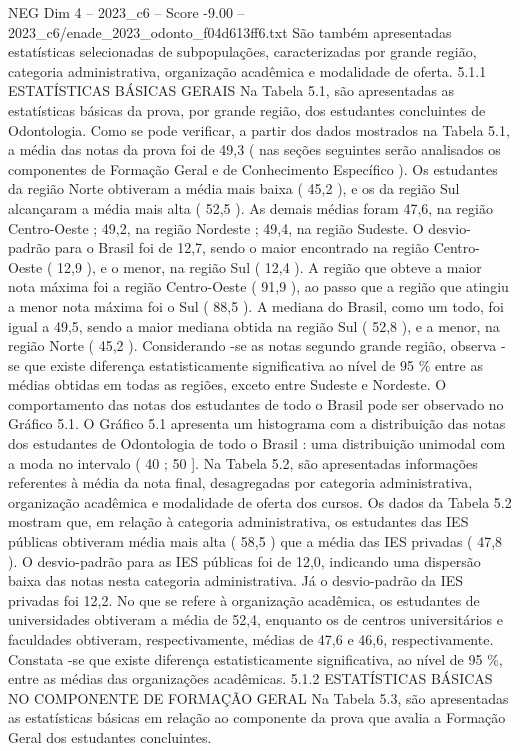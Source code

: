\begin{textsample}{NEG Dim 4 – 2023\_c6 – Score -9.00 – 2023\_c6/enade\_2023\_odonto\_f04d613ff6.txt}
São também apresentadas estatísticas selecionadas de subpopulações, caracterizadas por grande região, categoria administrativa, organização acadêmica e modalidade de oferta. 5.1.1 ESTATÍSTICAS BÁSICAS GERAIS Na Tabela 5.1, são apresentadas as estatísticas básicas da prova, por grande região, dos estudantes concluintes de Odontologia.
Como se pode verificar, a partir dos dados mostrados na Tabela 5.1, a média das notas da prova foi de 49,3 ( nas seções seguintes serão analisados os componentes de Formação Geral e de Conhecimento Específico ).
Os estudantes da região Norte obtiveram a média mais baixa ( 45,2 ), e os da região Sul alcançaram a média mais alta ( 52,5 ).
As demais médias foram 47,6, na região Centro-Oeste ; 49,2, na região Nordeste ; 49,4, na região Sudeste.
O desvio-padrão para o Brasil foi de 12,7, sendo o maior encontrado na região Centro-Oeste ( 12,9 ), e o menor, na região Sul ( 12,4 ).
A região que obteve a maior nota máxima foi a região Centro-Oeste ( 91,9 ), ao passo que a região que atingiu a menor nota máxima foi o Sul ( 88,5 ).
A mediana do Brasil, como um todo, foi igual a 49,5, sendo a maior mediana obtida na região Sul ( 52,8 ), e a menor, na região Norte ( 45,2 ).
Considerando -se as notas segundo grande região, observa -se que existe diferença estatisticamente significativa ao nível de 95 \% entre as médias obtidas em todas as regiões, exceto entre Sudeste e Nordeste.
O comportamento das notas dos estudantes de todo o Brasil pode ser observado no Gráfico 5.1.
O Gráfico 5.1 apresenta um histograma com a distribuição das notas dos estudantes de Odontologia de todo o Brasil : uma distribuição unimodal com a moda no intervalo ( 40 ; 50 ].
Na Tabela 5.2, são apresentadas informações referentes à média da nota final, desagregadas por categoria administrativa, organização acadêmica e modalidade de oferta dos cursos.
Os dados da Tabela 5.2 mostram que, em relação à categoria administrativa, os estudantes das IES públicas obtiveram média mais alta ( 58,5 ) que a média das IES privadas ( 47,8 ).
O desvio-padrão para as IES públicas foi de 12,0, indicando uma dispersão baixa das notas nesta categoria administrativa.
Já o desvio-padrão da IES privadas foi 12,2.
No que se refere à organização acadêmica, os estudantes de universidades obtiveram a média de 52,4, enquanto os de centros universitários e faculdades obtiveram, respectivamente, médias de 47,6 e 46,6, respectivamente.
Constata -se que existe diferença estatisticamente significativa, ao nível de 95 \%, entre as médias das organizações acadêmicas. 5.1.2 ESTATÍSTICAS BÁSICAS NO COMPONENTE DE FORMAÇÃO GERAL Na Tabela 5.3, são apresentadas as estatísticas básicas em relação ao componente da prova que avalia a Formação Geral dos estudantes concluintes.

\end{textsample}
